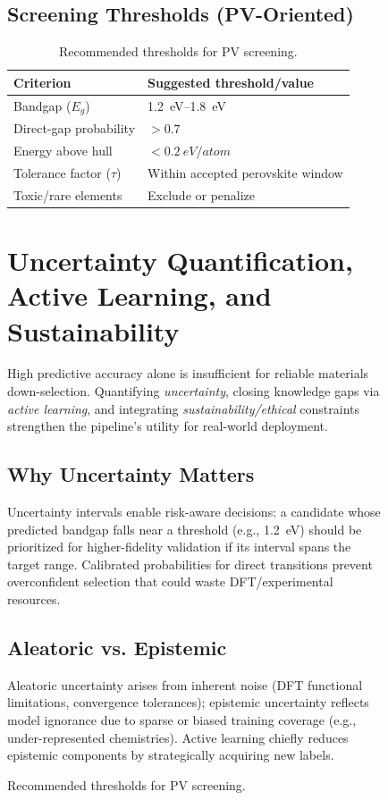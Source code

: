 \documentclass[conference]{IEEEtran}
\begin{document}
\begin{figure}[t!]
\subsection{Screening Thresholds (PV-Oriented)}
\begin{table}[h!]
  \centering
  \caption{Recommended thresholds for PV screening.}
  \label{tab:thresholds}
  \begin{tabular}{l l}
    \toprule
    Criterion & Suggested threshold/value \\
  \midrule
  Bandgap ($E_g$) & \SIrange{1.2}{1.8}{eV} \\
  Direct-gap probability & $>0.7$ \\
  Energy above hull & $<\SI{0.2}{eV/atom}$ \\
  Tolerance factor ($\tau$) & Within accepted perovskite window \\
  Toxic/rare elements & Exclude or penalize \\
  \bottomrule
  \end{tabular}
\end{table}

\clearpage
\section{Uncertainty Quantification, Active Learning, and Sustainability}\label{sec:uq}
High predictive accuracy alone is insufficient for reliable materials down-selection. Quantifying \emph{uncertainty}, closing knowledge gaps via \emph{active learning}, and integrating \emph{sustainability/ethical} constraints strengthen the pipeline's utility for real-world deployment.

\subsection{Why Uncertainty Matters}
Uncertainty intervals enable risk-aware decisions: a candidate whose predicted bandgap falls near a threshold (e.g., \SI{1.2}{\electronvolt}) should be prioritized for higher-fidelity validation if its interval spans the target range. Calibrated probabilities for direct transitions prevent overconfident selection that could waste DFT/experimental resources.

\subsection{Aleatoric vs. Epistemic}
Aleatoric uncertainty arises from inherent noise (DFT functional limitations, convergence tolerances); epistemic uncertainty reflects model ignorance due to sparse or biased training coverage (e.g., under-represented chemistries). Active learning chiefly reduces epistemic components by strategically acquiring new labels.


\end{figure}
\end{document}
